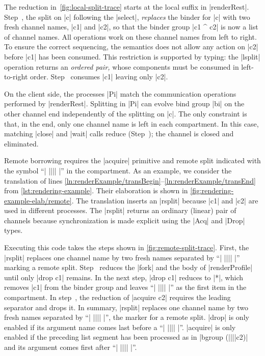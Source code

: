 The reduction in~\cref{fig:local-split-trace} starts at
the local suffix in |renderRest|. Step~, the split on |c| following
the |select|, \emph{replaces} the binder for |c| with two fresh channel names,
|c1| and |c2|, so that  the binder
group |c1 ^ c2| is now a list of channel names. All operations work on 
these channel names from left to right. To ensure the correct sequencing, the
semantics does not allow any action on |c2| before |c1| has been consumed. This
restriction is supported by typing: the |lsplit| operation returns an
\emph{ordered pair,} whose components must be consumed in
left-to-right order. Step~ consumes |c1|
leaving only |c2|.


On the client side, the processes |Pi| match the communication operations
performed by |renderRest|. Splitting in |Pi| can evolve bind group |bi| on the
other channel end
independently of the splitting on |c|. The only constraint is that, in the end,
only one channel name is left in each 
compartment. In this case, matching |close| and |wait| calls reduce
(Step~); the channel is closed and eliminated.

Remote borrowing requires the |acquire| primitive and
remote split indicated with the symbol ``| |||| |'' in the compartment. As an example, we
consider the translation of lines
\ref*{ln:renderExample/transBegin}--\ref*{ln:renderExample/transEnd} from
\cref{lst:rendering-example}. Their elaboration is shown in
\cref{fig:rendering-example-elab/remote}. 
The translation inserts an |rsplit| because |c1| and |c2| are used in different
processes. The |rsplit| returns an ordinary (linear) pair of channels because
synchronization is made explicit using the |Acq| and |Drop| types.

Executing this code takes the steps shown in
\cref{fig:remote-split-trace}. First, the |rsplit| replaces one channel name by
two fresh names separated by ``| |||| |'' marking a remote split.
Step~ reduces the |fork| and the body of |renderProfile| until only
|drop c1| remains. In the next step, |drop c1| reduces to |*|, which removes
|c1| from the binder group and leaves ``| |||| |'' as the first item in the 
compartment. In step~, the reduction of |acquire c2| requires the
leading separator and drops it. In summary, |rsplit| replaces one channel name by two fresh
names separated by ``| |||| |'', the marker for a remote split.  |drop| is only
enabled if its argument name comes last before a ``| |||| |''. |acquire| is only
enabled if the preceding list segment has been processed as in |bgroup
(||||c2)| and its argument comes first after  ``| |||| |''.

